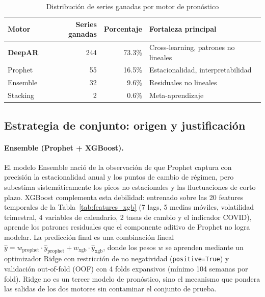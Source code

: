 \documentclass[12pt, letterpaper]{article}
\newcommand{\tabref}[1]{Tabla~\ref{#1}}
\begin{document}
\begin{table}[H]
\centering
\caption{Distribución de series ganadas por motor de pronóstico}
\label{tab:ranking}
\small
\begin{tabularx}{\textwidth}{l r r X}
\toprule
\textbf{Motor} & \textbf{Series ganadas} & \textbf{Porcentaje} & \textbf{Fortaleza principal} \\
\midrule
\rowcolor{cdeepar!10}
\textbf{DeepAR}   & 244 & 73.3\% & Cross-learning, patrones no lineales \\
\rowcolor{cprophet!10}
Prophet            & 55  & 16.5\% & Estacionalidad, interpretabilidad \\
\rowcolor{censemble!10}
Ensemble           & 32  & 9.6\%  & Residuales no lineales \\
\rowcolor{cstacking!10}
Stacking           & 2   & 0.6\%  & Meta-aprendizaje \\
\bottomrule
\end{tabularx}
\end{table}

\subsection{Estrategia de conjunto: origen y justificaci\'on}\label{subsec:ensambles}

\paragraph{Ensemble (Prophet + XGBoost).}
El modelo Ensemble naci\'o de la observaci\'on de que Prophet captura con precisi\'on la estacionalidad anual y los puntos de cambio de r\'egimen, pero subestima sistem\'aticamente los picos no estacionales y las fluctuaciones de corto plazo. XGBoost complementa esta debilidad: entrenado sobre las 20 features temporales de la \tabref{tab:features_xgb} (7 lags, 5 medias m\'oviles, volatilidad trimestral, 4 variables de calendario, 2 tasas de cambio y el indicador COVID), aprende los patrones residuales que el componente aditivo de Prophet no logra modelar. La predicci\'on final es una combinaci\'on lineal $\hat{y} = w_{\text{prophet}} \cdot \hat{y}_{\text{prophet}} + w_{\text{xgb}} \cdot \hat{y}_{\text{xgb}}$, donde los pesos $w$ se aprenden mediante un optimizador Ridge con restricci\'on de no negatividad (\texttt{positive=True}) y validaci\'on out-of-fold (OOF) con 4 folds expansivos (m\'inimo 104 semanas por fold). Ridge no es un tercer modelo de pron\'ostico, sino el mecanismo que pondera las salidas de los dos motores sin contaminar el conjunto de prueba.
\end{document}
